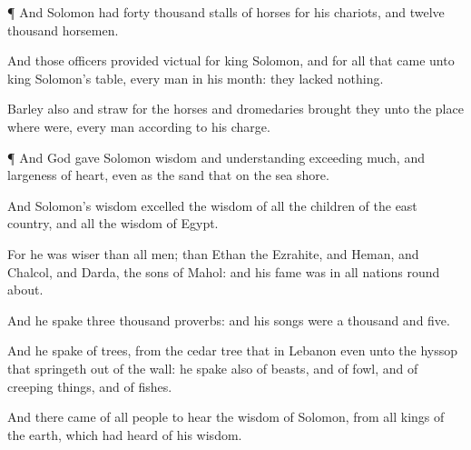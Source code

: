 {\par }{\PP {}¶ And
Solomon had
forty
thousand
stalls of
horses for his
chariots, and
twelve
thousand
horsemen.

And those
officers provided
victual for
king
Solomon, and for all that
came unto
king
Solomon’s
table, every
man in his
month: they
lacked
nothing.

Barley also and
straw for the
horses and
dromedaries
brought they unto the
place where
{} were, every
man according to his
charge.


\par }{\PP {}¶ And
God
gave
Solomon
wisdom and
understanding
exceeding
much, and
largeness of
heart, even as the
sand that
{} on the
sea
shore.

And
Solomon’s
wisdom
excelled the
wisdom of all the
children of the east
country, and all the
wisdom of
Egypt.

For he was
wiser than all
men; than
Ethan the
Ezrahite, and
Heman, and
Chalcol, and
Darda, the
sons of
Mahol: and his
fame was in all
nations round
about.

And he
spake
three
thousand
proverbs: and his
songs were a
thousand and
five.

And he
spake of
trees, from the cedar
tree that
{} in
Lebanon even unto the
hyssop that springeth
out of the
wall: he
spake also of
beasts, and of
fowl, and of creeping
things, and of
fishes.

And there
came of all
people to
hear the
wisdom of
Solomon, from all
kings of the
earth, which had
heard of his
wisdom.




\par }
